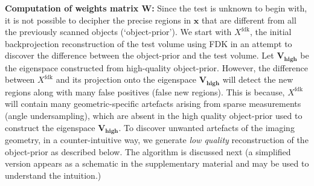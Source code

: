 \documentclass[journal]{IEEEtran}
\begin{document}
\textbf{Computation of weights matrix $\boldsymbol{W}$:}
Since the test is unknown to
begin with, it is not possible to decipher the precise regions in
$\boldsymbol{x}$ that are different from all the previously scanned
objects (`object-prior'). We start with $X^{\text{fdk}}$, the initial
backprojection reconstruction of the test volume using FDK in an attempt to
discover the difference between the object-prior and the test
volume. Let $\boldsymbol{V_{\text{high}}}$ be the eigenspace
constructed from high-quality object-prior. However, the difference
between $X^{\text{fdk}}$ and its projection onto the eigenspace
$\boldsymbol{V_{\text{high}}}$ will detect the new regions along with
many false positives (false new regions). This is because,
$X^{\text{fdk}}$ will contain many geometric-specific artefacts
arising from sparse measurements (angle undersampling), which are
absent in the high quality object-prior used to construct the
eigenspace $\boldsymbol{V_{\text{high}}}$. To discover unwanted
artefacts of the imaging geometry, in a counter-intuitive way, we
generate \emph{low quality} reconstruction of the object-prior as
described below.  The algorithm is discussed next (a simplified version
appears as a schematic in the supplementary material and may be used
to understand the intuition.)
\end{document}
